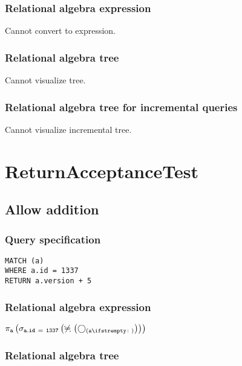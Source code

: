 \subsubsection*{Relational algebra expression}

Cannot convert to expression.

\subsubsection*{Relational algebra tree}

Cannot visualize tree.

\subsubsection*{Relational algebra tree for incremental queries}

Cannot visualize incremental tree.

\section{ReturnAcceptanceTest}

\subsection{Allow addition}

\subsubsection*{Query specification}

\begin{lstlisting}
MATCH (a)
WHERE a.id = 1337
RETURN a.version + 5
\end{lstlisting}

\subsubsection*{Relational algebra expression}

$\projection{\var{a}} \left(\selection{\mathtt{a.id~=~1337}} \left(\alldifferent{} \left(\getvertices{a}{}\right)\right)\right)$

\subsubsection*{Relational algebra tree}


